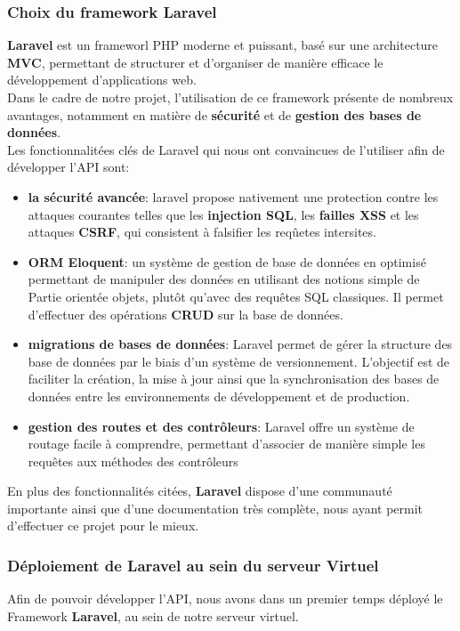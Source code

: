 \documentclass[10pt, a4paper]{report}
\begin{document}
	\subsubsection{Choix du framework Laravel}
	\textbf{Laravel} est un frameworl PHP moderne et puissant, basé sur une architecture \textbf{MVC}, permettant de structurer et d'organiser de manière efficace le développement d'applications web.\\
	Dans le cadre de notre projet, l'utilisation de ce framework présente de nombreux avantages, notamment en matière de \textbf{sécurité} et de \textbf{gestion des bases de données}.\\
	Les fonctionnalitées clés de Laravel qui nous ont convaincues de l'utiliser afin de développer l'API sont:
	\begin{itemize}
		\item \textbf{la sécurité avancée}: laravel propose nativement une protection contre les attaques courantes telles que les \textbf{injection SQL}, les \textbf{failles XSS} et les attaques \textbf{CSRF}, qui consistent à falsifier les reqûetes intersites.
		
		\item \textbf{ORM Eloquent}: un système de gestion de base de données en optimisé permettant de manipuler des données en utilisant des notions simple de Partie orientée objets, plutôt qu'avec des requêtes SQL classiques. Il permet d'effectuer des opérations \textbf{CRUD} sur la base de données.
		
		\item \textbf{migrations de bases de données}: Laravel permet de gérer la structure des base de données par le biais d'un système de versionnement. L'objectif est de faciliter la création, la mise à jour ainsi que la synchronisation des bases de données entre les environnements de développement et de production.
		
		\item \textbf{gestion des routes et des contrôleurs}: Laravel offre un système de routage facile à comprendre, permettant d'associer de manière simple les requêtes aux méthodes des contrôleurs
	\end{itemize}
	En plus des fonctionnalités citées, \textbf{Laravel} dispose d'une communauté importante ainsi que d'une documentation très complète, nous ayant permit d'effectuer ce projet pour le mieux.
	
	\subsubsection{Déploiement de Laravel au sein du serveur Virtuel}
	Afin de pouvoir développer l'API, nous avons dans un premier temps déployé le Framework \textbf{Laravel}, au sein de notre serveur virtuel.\\
	
\end{document}
